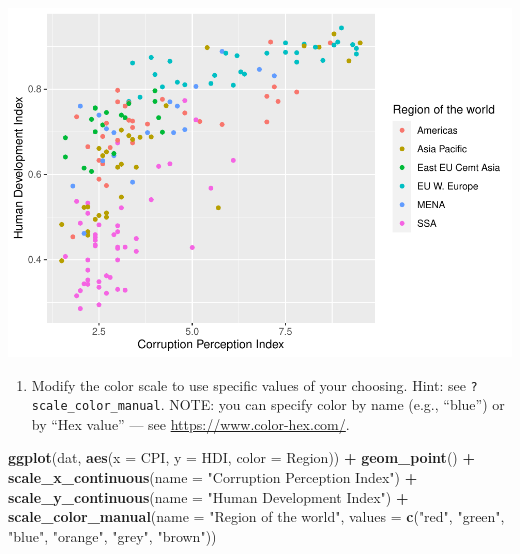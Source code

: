 \documentclass[
]{book}
\newenvironment{Shaded}{\begin{snugshade}}{\end{snugshade}}
\newcommand{\DataTypeTok}[1]{\textcolor[rgb]{0.13,0.29,0.53}{#1}}
\newcommand{\KeywordTok}[1]{\textcolor[rgb]{0.13,0.29,0.53}{\textbf{#1}}}
\newcommand{\NormalTok}[1]{#1}
\newcommand{\OperatorTok}[1]{\textcolor[rgb]{0.81,0.36,0.00}{\textbf{#1}}}
\newcommand{\StringTok}[1]{\textcolor[rgb]{0.31,0.60,0.02}{#1}}
\providecommand{\tightlist}{%
  \setlength{\itemsep}{0pt}\setlength{\parskip}{0pt}}
\begin{document}
\begin{alert}
\includegraphics{R/Rgraphics/figures/unnamed-chunk-190-1.pdf}

\begin{enumerate}
\def\labelenumi{\arabic{enumi}.}
\setcounter{enumi}{2}
\tightlist
\item
  Modify the color scale to use specific values of your choosing. Hint: see \texttt{?scale\_color\_manual}. NOTE: you can specify color by name (e.g., ``blue'') or by ``Hex value'' --- see \url{https://www.color-hex.com/}.
\end{enumerate}

\begin{Shaded}
\begin{Highlighting}[]
\KeywordTok{ggplot}\NormalTok{(dat, }\KeywordTok{aes}\NormalTok{(}\DataTypeTok{x =}\NormalTok{ CPI, }\DataTypeTok{y =}\NormalTok{ HDI, }\DataTypeTok{color =}\NormalTok{ Region)) }\OperatorTok{+}
\StringTok{  }\KeywordTok{geom\_point}\NormalTok{() }\OperatorTok{+}
\StringTok{  }\KeywordTok{scale\_x\_continuous}\NormalTok{(}\DataTypeTok{name =} \StringTok{"Corruption Perception Index"}\NormalTok{) }\OperatorTok{+}
\StringTok{  }\KeywordTok{scale\_y\_continuous}\NormalTok{(}\DataTypeTok{name =} \StringTok{"Human Development Index"}\NormalTok{) }\OperatorTok{+}
\StringTok{  }\KeywordTok{scale\_color\_manual}\NormalTok{(}\DataTypeTok{name =} \StringTok{"Region of the world"}\NormalTok{,}
                     \DataTypeTok{values =} \KeywordTok{c}\NormalTok{(}\StringTok{"red"}\NormalTok{, }\StringTok{"green"}\NormalTok{, }\StringTok{"blue"}\NormalTok{, }\StringTok{"orange"}\NormalTok{, }\StringTok{"grey"}\NormalTok{, }\StringTok{"brown"}\NormalTok{))}
\end{Highlighting}
\end{Shaded}


\end{alert}
\end{document}
